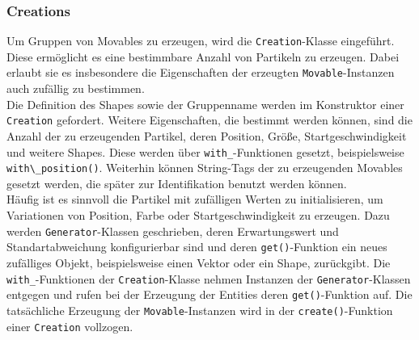 \documentclass[11pt,a4paper]{article}
\begin{document}
\subsubsection{Creations}
Um Gruppen von Movables zu erzeugen, wird die \lstinline!Creation!-Klasse eingeführt. Diese ermöglicht es eine bestimmbare Anzahl von Partikeln zu erzeugen. Dabei erlaubt sie es insbesondere die Eigenschaften der erzeugten \lstinline!Movable!-Instanzen auch zufällig zu bestimmen.\\
Die Definition des Shapes sowie der Gruppenname werden im Konstruktor einer \lstinline!Creation! gefordert. Weitere Eigenschaften, die bestimmt werden können, sind die Anzahl der zu erzeugenden Partikel, deren Position, Größe, Startgeschwindigkeit und weitere Shapes. Diese werden über \lstinline!with_!-Funktionen gesetzt, beispielsweise \lstinline!with\_position()!. Weiterhin können String-Tags der zu erzeugenden Movables gesetzt werden, die später zur Identifikation benutzt werden können.\\
Häufig ist es sinnvoll die Partikel mit zufälligen Werten zu initialisieren, um Variationen von Position, Farbe oder Startgeschwindigkeit zu erzeugen. Dazu werden \lstinline!Generator!-Klassen geschrieben, deren Erwartungswert und Standartabweichung konfigurierbar sind und deren \lstinline!get()!-Funktion ein neues zufälliges Objekt, beispielsweise einen Vektor oder ein Shape, zurückgibt. Die \lstinline!with_!-Funktionen der \lstinline!Creation!-Klasse nehmen Instanzen der \lstinline!Generator!-Klassen entgegen und rufen bei der Erzeugung der Entities deren \lstinline!get()!-Funktion auf. Die tatsächliche Erzeugung der \lstinline!Movable!-Instanzen wird in der \lstinline!create()!-Funktion einer \lstinline!Creation! vollzogen.

\newpage
\end{document}
